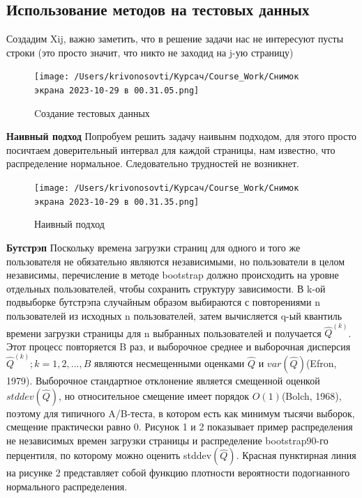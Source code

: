\documentclass[specialist,
               substylefile = spbu_report.rtx,
               subf,href,colorlinks=true, 12pt]{disser}
\begin{document}
    
    \subsection*{Использование методов на тестовых данных}
        
        Создадим Xij, важно заметить, что в решение задачи нас не интересуют пусты строки (это просто значит, что никто не заходид на j-ую страницу)
        

        \begin{figure}[h]
            \centering
            \texttt{[image: /Users/krivonosovti/Курсач/Course\_Work/Снимок экрана 2023-10-29 в 00.31.05.png]}
            \caption{Cоздание тестовых данных}
        \end{figure}
        
       

        \textbf{Наивный подход} 
        Попробуем решить задачу наивынм подходом, для этого просто посичтаем доверительный интервал для каждой страницы, нам известно, что распределение нормальное. Следовательно трудностей не возникнет. 


        \begin{figure}[h]
            \centering
            \texttt{[image: /Users/krivonosovti/Курсач/Course\_Work/Снимок экрана 2023-10-29 в 00.31.35.png]}
            \caption{Наивный подход}
        \end{figure}
        
        
        \textbf{Бутстрэп}
        Поскольку времена загрузки страниц для одного и того же пользователя не обязательно являются независимыми, но пользователи в целом независимы, перечисление в методе bootstrap должно происходить на уровне отдельных пользователей, 
        чтобы сохранить структуру зависимости. В k-ой подвыборке бутстрэпа случайным образом выбираются с повторениями n 
        пользователей из исходных n пользователей, затем вычисляется q-ый квантиль времени загрузки страницы для n 
        выбранных пользователей и получается $ \widehat{Q}^{(k)}$. Этот процесс повторяется B раз, и выборочное среднее и выборочная
        дисперсия ${\widehat{Q}^{(k)}; k = 1, 2, . . . , B}$ являются несмещенными оценками $\widehat{Q}$  и $var(\widehat{Q})$(Efron, 1979). Выборочное 
        стандартное отклонение является смещенной оценкой $stddev(\widehat{Q})$, но относительное смещение имеет порядок $O(1)$(Bolch, 1968), поэтому для типичного A/B-теста,
        в котором есть как минимум тысячи выборок, смещение практически равно 0. Рисунок 1 и 2 показывает пример распределения 
        не независимых времен загрузки страницы и распределение bootstrap90-го перцентиля, по которому можно оценить stddev$(\widehat{Q})$.
        Красная пунктирная линия на рисунке 2 представляет собой функцию плотности вероятности подогнанного нормального распределения.
\end{document}
